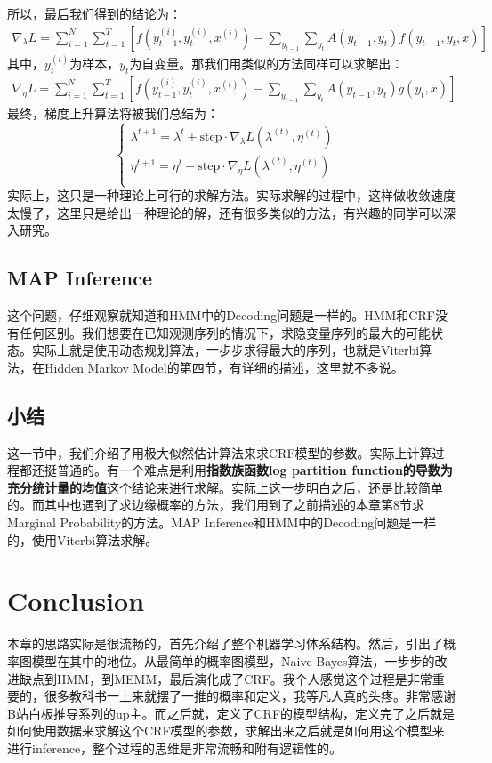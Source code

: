 \documentclass[a4paper]{article}
\begin{document}
所以，最后我们得到的结论为：
\begin{equation}
    \begin{split}
        \nabla_\lambda L = \sum_{i=1}^N \sum_{t=1}^T \left[ f(y_{t-1}^{(i)},y_{t}^{(i)},x^{(i)}) - \sum_{y_{t-1}}\sum_{y_t}A(y_{t-1},y_t) f(y_{t-1},y_{t},x) \right]
    \end{split}
\end{equation}
其中，$y_{t}^{(i)}$为样本，$y_{t}$为自变量。那我们用类似的方法同样可以求解出：
\begin{equation}
    \begin{split}
        \nabla_\eta L = \sum_{i=1}^N \sum_{t=1}^T \left[ f(y_{t-1}^{(i)},y_{t}^{(i)},x^{(i)}) - \sum_{y_{t-1}}\sum_{y_t}A(y_{t-1},y_t) g(y_{t},x) \right]
    \end{split}
\end{equation}
最终，梯度上升算法将被我们总结为：
\begin{equation}
\left\{
\begin{array}{ll}
      \lambda^{t+1} = \lambda^{t}+\mathrm{step}\cdot \nabla_\lambda L(\lambda^{(t)},\eta^{(t)})  & \\
      \eta^{t+1} = \eta^{t}+\mathrm{step}\cdot \nabla_\eta L(\lambda^{(t)},\eta^{(t)})  & \\
\end{array}
\right.
\end{equation}
实际上，这只是一种理论上可行的求解方法。实际求解的过程中，这样做收敛速度太慢了，这里只是给出一种理论的解，还有很多类似的方法，有兴趣的同学可以深入研究。

\subsection{MAP Inference}
这个问题，仔细观察就知道和HMM中的Decoding问题是一样的。HMM和CRF没有任何区别。我们想要在已知观测序列的情况下，求隐变量序列的最大的可能状态。实际上就是使用动态规划算法，一步步求得最大的序列，也就是Viterbi算法，在Hidden Markov Model的第四节，有详细的描述，这里就不多说。

\subsection{小结}
这一节中，我们介绍了用极大似然估计算法来求CRF模型的参数。实际上计算过程都还挺普通的。有一个难点是利用\textbf{指数族函数log partition function的导数为充分统计量的均值}这个结论来进行求解。实际上这一步明白之后，还是比较简单的。而其中也遇到了求边缘概率的方法，我们用到了之前描述的本章第8节求Marginal Probability的方法。MAP Inference和HMM中的Decoding问题是一样的，使用Viterbi算法求解。

\section{Conclusion}
本章的思路实际是很流畅的，首先介绍了整个机器学习体系结构。然后，引出了概率图模型在其中的地位。从最简单的概率图模型，Naive Bayes算法，一步步的改进缺点到HMM，到MEMM，最后演化成了CRF。我个人感觉这个过程是非常重要的，很多教科书一上来就摆了一推的概率和定义，我等凡人真的头疼。非常感谢B站白板推导系列的up主。而之后就，定义了CRF的模型结构，定义完了之后就是如何使用数据来求解这个CRF模型的参数，求解出来之后就是如何用这个模型来进行inference，整个过程的思维是非常流畅和附有逻辑性的。
\end{document}
